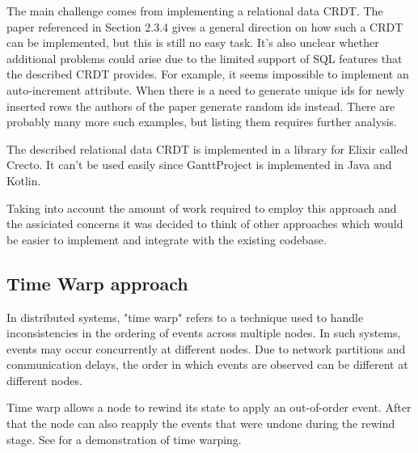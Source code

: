 \documentclass[a4paper, 11pt, oneside]{article}
\theoremstyle{definition}
\begin{document}
The main challenge comes from implementing a relational data CRDT. The paper referenced in Section 2.3.4 gives a general direction on how such a CRDT can be implemented, but this is still no easy task. It's also unclear whether additional problems could arise due to the limited support of SQL features that the described CRDT provides. For example, it seems impossible to implement an auto-increment attribute. When there is a need to generate unique ids for newly inserted rows the authors of the paper generate random ids instead. There are probably many more such examples, but listing them requires further analysis. 

The described relational data CRDT is implemented in a library for Elixir called Crecto. It can't be used easily since GanttProject is implemented in Java and Kotlin. 

Taking into account the amount of work required to employ this approach and the assiciated concerns it was decided to think of other approaches which would be easier to implement and integrate with the existing codebase.


\subsection{Time Warp approach}

In distributed systems, "time warp" refers to a technique used to handle inconsistencies in the ordering of events across multiple nodes. In such systems, events may occur concurrently at different nodes. Due to network partitions and communication delays, the order in which events are observed can be different at different nodes.

Time warp allows a node to rewind its state to apply an out-of-order event. After that the node can also reapply the events that were undone during the rewind stage. See  for a demonstration of time warping.
\end{document}
